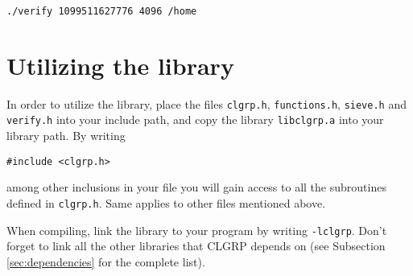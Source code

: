 \documentclass[a4paper,10pt]{article}
\newcommand{\code}{\lstinline}
\begin{document}
\begin{lstlisting}
./verify 1099511627776 4096 /home
\end{lstlisting}





\section{Utilizing the library} \label{subsec:clgrp_lib}

In order to utilize the library, place the files \code{clgrp.h}, \code{functions.h}, \code{sieve.h} and \code{verify.h} into your include path, and copy the library \code{libclgrp.a} into your library path. By writing
%
\begin{lstlisting}
#include <clgrp.h>
\end{lstlisting}
%
among other inclusions in your file you will gain access to all the subroutines defined in \code{clgrp.h}. Same applies to other files mentioned above.

When compiling, link the library to your program by writing \code{-lclgrp}. Don't forget to link all the other libraries that CLGRP depends on (see Subsection \ref{sec:dependencies} for the complete list).
\end{document}
